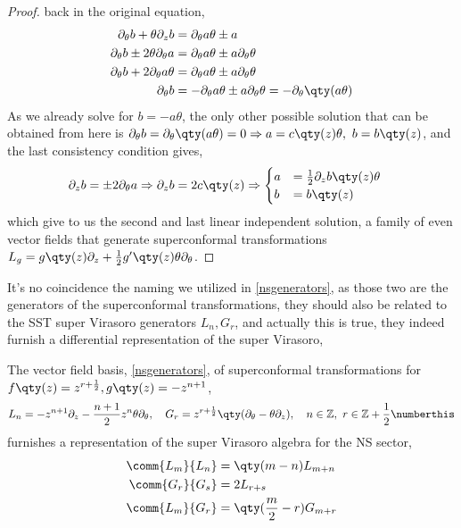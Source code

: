 \begin{proof}
back in the original equation,
\begin{align*}
    \partial_\theta b+\theta\partial_z b&=\partial_\theta a\theta\pm a\\
    \partial_\theta b\pm2\theta\partial_\theta a&=\partial_\theta a\theta\pm a\partial_\theta \theta\\
    \partial_\theta b+2\partial_\theta a\theta&=\partial_\theta a\theta\pm a\partial_\theta \theta\\
    \partial_\theta b&=-\partial_\theta a\theta\pm a\partial_\theta \theta=-\partial_\theta\qty(a\theta)
\end{align*}
As we already solve for $b=-a\theta$, the only other possible solution that can be obtained from here is 
$\partial_\theta b=\partial_\theta\qty(a\theta)=0\Rightarrow a=c\qty(z)\theta,\ b=b\qty(z)$, and the last consistency 
condition gives,
\begin{align*}
    \partial_z b&=\pm 2\partial_\theta a\Rightarrow\partial_z b= 2c\qty(z)\Rightarrow \begin{cases}a &= \frac12 \partial_z b\qty(z)\theta\\b &= b\qty(z)\end{cases} 
\end{align*}
which give to us the second and last linear independent solution, a family of even vector fields that generate 
superconformal transformations $L_g=g\qty(z)\partial_z+\frac12g'\qty(z)\theta\partial_\theta$.
\end{proof}
It's no coincidence the naming we utilized in \cref{nsgenerators}, as those two are the generators of the 
superconformal transformations, they should also be related to the SST super Virasoro generators $L_n,G_r$, 
and actually this is true, they indeed furnish a differential representation of the super Virasoro,
\begin{lemma}\label{lemma:nsgenerators}
    The vector field basis, \cref{nsgenerators}, of superconformal transformations for $f\qty(z)=z^{r+\frac12},g\qty(z)=-z^{n+1}$, 
    \[L_n=-z^{n+1}\partial_z-\frac{n+1}{2}z^n\theta\partial_\theta,\ \ \ G_r=z^{r+\frac12}\qty(\partial_\theta-\theta\partial_z),\ \ \ n\in\mathbb Z,\ r\in\mathbb Z+\frac12\numberthis\label{generators:ns2}\]
    furnishes a representation of the super Virasoro algebra for the NS sector,
    \begin{subequations}\label{supervirasoro:ns}\begin{align}
        \comm{L_m}{L_n}&=\qty(m-n)L_{m+n}\\
        \comm{G_r}{G_s}&=2L_{r+s}\\
        \comm{L_m}{G_r}&=\qty(\frac m2-r)G_{m+r}
    \end{align}\end{subequations}
\end{lemma}
